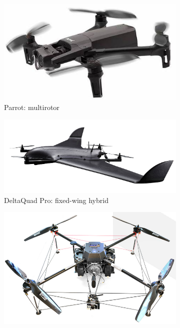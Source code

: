 \begin{figure}[htb!]
  \begin{subfigure}[t]{0.35\textwidth}
  \includegraphics[width=1.0\textwidth]{./img/jpg/uav-parrot-multirotor.jpg}
  \caption{Parrot: multirotor~\cite{parrotDrone}}%
  \label{fig:uav-multirotor}
  \end{subfigure}
%
  \begin{subfigure}[t]{0.35\textwidth}
  \includegraphics[width=1.0\textwidth]{./img/jpg/uav-deltaQuadPro-hybrid.jpg}
  \caption{DeltaQuad Pro: fixed-wing hybrid~\cite{deltaQuadDrone}}%
  \label{fig:uav-fixed-wing-hybrid}
  \end{subfigure}
%
  \begin{subfigure}[t]{0.35\textwidth}
  \includegraphics[width=1.0\textwidth]{./img/jpg/uav-energyorQuad1000-hfc.jpg}

\end{subfigure}
\end{figure}
